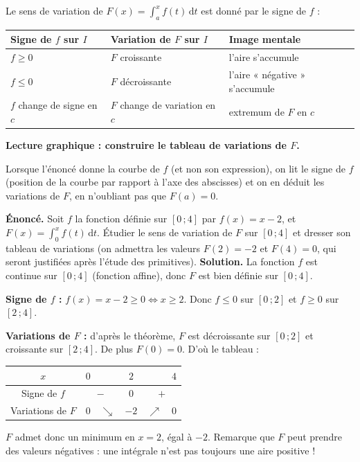 \documentclass[11pt]{article}
\newcommand{\cle}[1]{{\popxbold\color{popdark}#1}}
\begin{document}
\begin{aretenir}
Le \cle{sens de variation} de $F(x) = \int_a^x f(t)\,\mathrm{d}t$ est donné par le \cle{signe} de $f$ :
\begin{center}
\begin{tabularx}{\linewidth}{|l|X|X|}
\hline
\rowcolor{popblueL} Signe de $f$ sur $I$ & Variation de $F$ sur $I$ & Image mentale \\
\hline
$f \geq 0$ & $F$ croissante & l'aire s'accumule \\
\hline
$f \leq 0$ & $F$ décroissante & l'aire « négative » s'accumule \\
\hline
$f$ change de signe en $c$ & $F$ change de variation en $c$ & extremum de $F$ en $c$ \\
\hline
\end{tabularx}
\end{center}
\end{aretenir}

\textbf{Lecture graphique : construire le tableau de variations de $F$.}\par
Lorsque l'énoncé donne la courbe de $f$ (et non son expression), on lit le signe de $f$ (position de la courbe par rapport à l'axe des abscisses) et on en déduit les variations de $F$, en n'oubliant pas que $F(a) = 0$.

\begin{exoresolu}
\textbf{Énoncé.} Soit $f$ la fonction définie sur $[0\,;4]$ par $f(x) = x - 2$, et $F(x) = \int_0^x f(t)\,\mathrm{d}t$. Étudier le sens de variation de $F$ sur $[0\,;4]$ et dresser son tableau de variations (on admettra les valeurs $F(2) = -2$ et $F(4) = 0$, qui seront justifiées après l'étude des primitives).
\tcblower
\textbf{Solution.} La fonction $f$ est continue sur $[0\,;4]$ (fonction affine), donc $F$ est bien définie sur $[0\,;4]$.

\textbf{Signe de $f$ :} $f(x) = x - 2 \geq 0 \iff x \geq 2$. Donc $f \leq 0$ sur $[0\,;2]$ et $f \geq 0$ sur $[2\,;4]$.

\textbf{Variations de $F$ :} d'après le théorème, $F$ est décroissante sur $[0\,;2]$ et croissante sur $[2\,;4]$. De plus $F(0) = 0$. D'où le tableau :
\begin{center}
\begin{tabular}{|c|ccccc|}
\hline
$x$ & $0$ & \hspace{1.2cm} & $2$ & \hspace{1.2cm} & $4$ \\
\hline
Signe de $f$ & \multicolumn{2}{c|}{$-$} & $0$ & \multicolumn{2}{c|}{$+$} \\
\hline
Variations de $F$ & $0$ & $\searrow$ & $-2$ & $\nearrow$ & $0$ \\
\hline
\end{tabular}
\end{center}
$F$ admet donc un minimum en $x = 2$, égal à $-2$. Remarque que $F$ peut prendre des valeurs négatives : une intégrale n'est pas toujours une aire positive !
\end{exoresolu}
\end{document}
